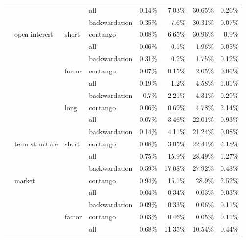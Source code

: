 \documentclass[]{elsarticle} %
\begin{document}
\begin{longtable}[t]{>{}llllrrrr}
\nopagebreak
 &  &  & all & 0.14\% & 7.03\% & 30.65\% & 0.26\%\\
\nopagebreak
 &  &  & backwardation & 0.35\% & 7.6\% & 30.31\% & 0.07\%\\
\nopagebreak
 & \multirow[t]{-9}{*}{\raggedright\arraybackslash open interest} & \multirow[t]{-3}{*}{\raggedright\arraybackslash short} & contango & 0.08\% & 6.65\% & 30.96\% & 0.9\%\\
\nopagebreak
 &  &  & all & 0.06\% & 0.1\% & 1.96\% & 0.05\%\\
\nopagebreak
 &  &  & backwardation & 0.31\% & 0.2\% & 1.75\% & 0.12\%\\
\nopagebreak
 &  & \multirow[t]{-3}{*}{\raggedright\arraybackslash factor} & contango & 0.07\% & 0.15\% & 2.05\% & 0.06\%\\
\nopagebreak
 &  &  & all & 0.19\% & 1.2\% & 4.58\% & 1.01\%\\
\nopagebreak
 &  &  & backwardation & 0.7\% & 2.21\% & 4.31\% & 0.29\%\\
\nopagebreak
 &  & \multirow[t]{-3}{*}{\raggedright\arraybackslash long} & contango & 0.06\% & 0.69\% & 4.78\% & 2.14\%\\
\nopagebreak
 &  &  & all & 0.07\% & 3.46\% & 22.01\% & 0.93\%\\
\nopagebreak
 &  &  & backwardation & 0.14\% & 4.11\% & 21.24\% & 0.08\%\\
\nopagebreak
\multirow[t]{-30}{*}{\raggedright\arraybackslash \textbf{open interest}} & \multirow[t]{-9}{*}{\raggedright\arraybackslash term structure} & \multirow[t]{-3}{*}{\raggedright\arraybackslash short} & contango & 0.08\% & 3.05\% & 22.44\% & 2.18\%\\
\cmidrule{1-8}\pagebreak[0]
 &  &  & all & 0.75\% & 15.9\% & 28.49\% & 1.27\%\\
\nopagebreak
 &  &  & backwardation & 0.59\% & 17.08\% & 27.92\% & 0.43\%\\
\nopagebreak
 & \multirow[t]{-3}{*}{\raggedright\arraybackslash market} &  & contango & 0.94\% & 15.1\% & 28.9\% & 2.52\%\\
\nopagebreak
 &  &  & all & 0.04\% & 0.34\% & 0.03\% & 0.03\%\\
\nopagebreak
 &  &  & backwardation & 0.09\% & 0.33\% & 0.06\% & 0.11\%\\
\nopagebreak
 &  & \multirow[t]{-6}{*}{\raggedright\arraybackslash factor} & contango & 0.03\% & 0.46\% & 0.05\% & 0.11\%\\
\nopagebreak
 &  &  & all & 0.68\% & 11.35\% & 10.54\% & 0.44\%\\

\end{longtable}
\end{document}
